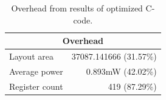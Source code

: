 \begin{table}[hbtp]
    \centering
    \begin{tabular}{lr}
    \multicolumn{2}{c}{\textbf{Overhead}} \\
    \toprule
    Layout area & 37087.141666 (31.57\%) \\
    Average power & 0.893mW (42.02\%) \\
    Register count & 419 (87.29\%) \\
    \bottomrule
    \end{tabular}
    \caption{Overhead from results of optimized C-code.}
    \label{tab:overheadframeworkrun3}
\end{table}

